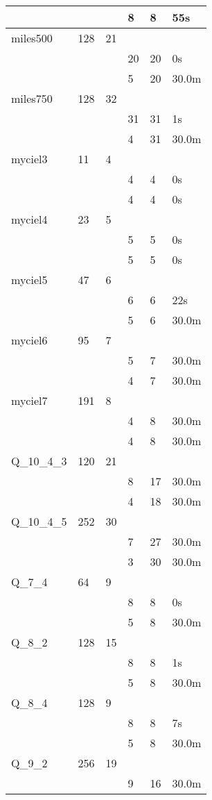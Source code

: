 \begin{table}[]
\begin{tabular}{|lll|l|l|l|}
&&&8  &8 &55s\\
\cline{4-6}
\hline
miles500&128&21&&&\\
&&&20  &20 &0s\\
\cline{4-6}
&&&5  &20 &30.0m\\
\cline{4-6}
\hline
miles750&128&32&&&\\
&&&31  &31 &1s\\
\cline{4-6}
&&&4  &31 &30.0m\\
\cline{4-6}
\hline
myciel3&11&4&&&\\
&&&4  &4 &0s\\
\cline{4-6}
&&&4  &4 &0s\\
\cline{4-6}
\hline
myciel4&23&5&&&\\
&&&5  &5 &0s\\
\cline{4-6}
&&&5  &5 &0s\\
\cline{4-6}
\hline
myciel5&47&6&&&\\
&&&6  &6 &22s\\
\cline{4-6}
&&&5  &6 &30.0m\\
\cline{4-6}
\hline
myciel6&95&7&&&\\
&&&5  &7 &30.0m\\
\cline{4-6}
&&&4  &7 &30.0m\\
\cline{4-6}
\hline
myciel7&191&8&&&\\
&&&4  &8 &30.0m\\
\cline{4-6}
&&&4  &8 &30.0m\\
\cline{4-6}
\hline
Q\_10\_4\_3&120&21&&&\\
&&&8  &17 &30.0m\\
\cline{4-6}
&&&4  &18 &30.0m\\
\cline{4-6}
\hline
Q\_10\_4\_5&252&30&&&\\
&&&7  &27 &30.0m\\
\cline{4-6}
&&&3  &30 &30.0m\\
\cline{4-6}
\hline
Q\_7\_4&64&9&&&\\
&&&8  &8 &0s\\
\cline{4-6}
&&&5  &8 &30.0m\\
\cline{4-6}
\hline
Q\_8\_2&128&15&&&\\
&&&8  &8 &1s\\
\cline{4-6}
&&&5  &8 &30.0m\\
\cline{4-6}
\hline
Q\_8\_4&128&9&&&\\
&&&8  &8 &7s\\
\cline{4-6}
&&&5  &8 &30.0m\\
\cline{4-6}
\hline
Q\_9\_2&256&19&&&\\
&&&9  &16 &30.0m\\

\end{tabular}
\end{table}
